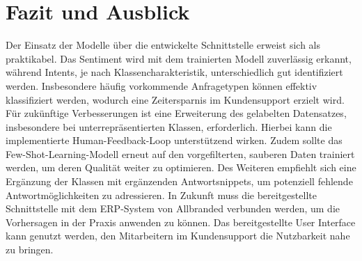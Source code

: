 \chapter{Fazit und Ausblick}

Der Einsatz der Modelle über die entwickelte Schnittstelle erweist sich als praktikabel. Das Sentiment wird mit dem trainierten Modell zuverlässig erkannt, während Intents, je nach Klassencharakteristik, unterschiedlich gut identifiziert werden. Insbesondere häufig vorkommende Anfragetypen können effektiv klassifiziert werden, wodurch eine Zeitersparnis im Kundensupport erzielt wird. Für zukünftige Verbesserungen ist eine Erweiterung des gelabelten Datensatzes, insbesondere bei unterrepräsentierten Klassen, erforderlich. Hierbei kann die implementierte Human-Feedback-Loop unterstützend wirken. Zudem sollte das Few-Shot-Learning-Modell erneut auf den vorgefilterten, sauberen Daten trainiert werden, um deren Qualität weiter zu optimieren. Des Weiteren empfiehlt sich eine Ergänzung der Klassen mit ergänzenden Antwortsnippets, um potenziell fehlende Antwortmöglichkeiten zu adressieren. In Zukunft muss die bereitgestellte Schnittstelle mit dem ERP-System von Allbranded verbunden werden, um die Vorhersagen in der Praxis anwenden zu können. Das bereitgestellte User Interface kann genutzt werden, den Mitarbeitern im Kundensupport die Nutzbarkeit nahe zu bringen. 